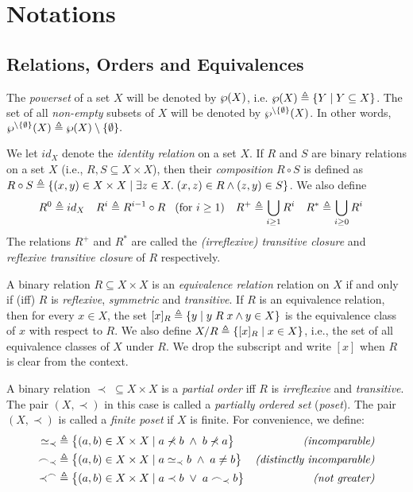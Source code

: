 \documentclass{llncs}
\begin{document}
\section{Notations \label{sec:background}}


\subsection{Relations, Orders and Equivalences}

The \emph{powerset} of a set $X$ will be denoted by $\wp(X)$, i.e.
$\wp(X)\triangleq\{Y \mid Y\subseteq X\}$. The set of all {\em non-empty} subsets of $X$
will be denoted by $\wp^{\setminus \{\emptyset\}}(X)$. In other words,
$\wp^{\setminus \{\emptyset\}}(X)\triangleq\wp(X)\setminus\{\emptyset\}.$ 

We let $\mathit{id}_X$ denote the \emph{identity relation} on a set $X$. If $R$ and $S$ are binary relations on a set $X$ (i.e., $R,S\subseteq X\times X$), then their \emph{composition} $R\circ S$ is defined as $R\circ S\triangleq\{(x,y)\in X\times X\mid \exists z\in X.\;(x,z)\in R\wedge (z,y)\in S\}$. We also define
\begin{align*}
R^{0}&\triangleq id_X & R^{i}&\triangleq R^{i-1}\circ R\hspace*{3mm} (\text{for }i\ge 1) &R^{+}&\triangleq \bigcup_{i\ge 1}R^i	&R^{*}&\triangleq \bigcup_{i\ge 0}R^i
\end{align*}
The relations $R^{+}$ and $R^{*}$ are called the \emph{(irreflexive) transitive closure} and \emph{reflexive transitive closure} of $R$ respectively.


A binary relation $R\subseteq X\times X$ is an \emph{equivalence relation} relation on $X$ if and only if (iff) $R$ is {\em reflexive},  {\em symmetric} and {\em transitive}. If $R$ is an equivalence relation, then for every $x\in X$, the set $[x]_R \triangleq \{y\;|\;y\;R\;x \wedge y\in X\}$ is the equivalence class of $x$ with respect to $R$. We also define $X/R\triangleq\{[x]_R\mid x\in X\}$, i.e., the set of all equivalence classes of $X$ under $R$. We drop the subscript and write $[x]$ when $R$ is clear from the context. 

A binary relation $\prec \;\subseteq X \times X$ is a
{\em partial order} iff $R$ is {\em irreflexive} and {\em transitive}.
The pair $(X,\prec)$ in this case is called a \emph{partially ordered set} (\emph{poset}). The pair $(X,\prec)$ is called a \emph{finite poset} if $X$ is finite. For convenience, we define:
\begin{align*}
\simeq_\prec  &\triangleq  \bigl\{(a,b)\in X\times X\mid a\not\prec b \;\wedge\; b\not\prec a\bigr\}& \text{\emph{(incomparable)}}\\
\frown_\prec  &\triangleq \bigl\{(a,b)\in X\times X\mid  a \simeq_\prec b \;\wedge\; a\neq b\bigr\} &
\text{\emph{(distinctly incomparable)}}\\
\prec^\frown  &\triangleq \bigl\{(a,b)\in X\times X\mid a \prec b \;\vee\; a\frown_\prec b\bigr\} & \text{\emph{(not greater)}}
\end{align*}
\end{document}
